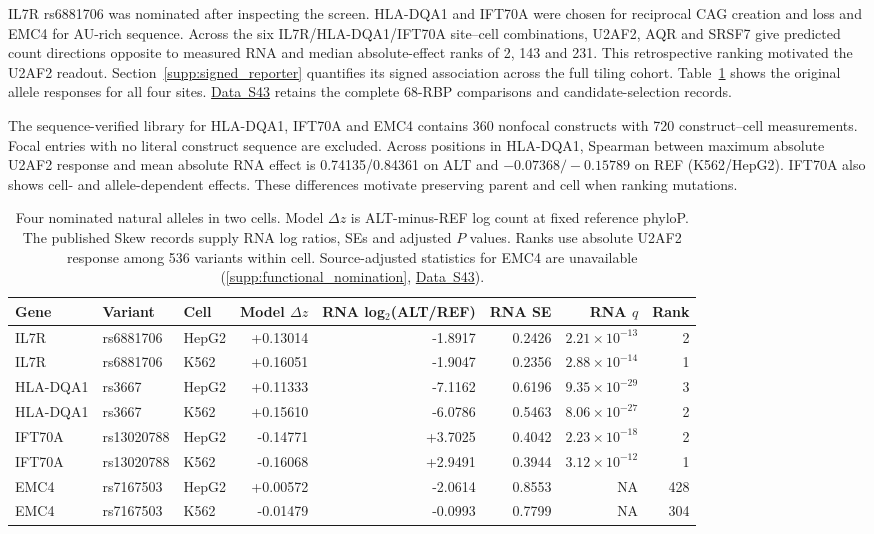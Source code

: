 \documentclass[11pt,a4paper]{article}
\newcommand{\tableid}[1]{\setcounter{table}{\numexpr#1-1\relax}}
\newcommand{\sr}[1]{\ref{#1}}
\newcommand{\data}[1]{\hyperref[data:S#1]{Data~S#1}}
\begin{document}
IL7R rs6881706 was nominated after inspecting the screen. HLA-DQA1 and IFT70A were chosen for reciprocal CAG creation and loss and EMC4 for AU-rich sequence. Across the six IL7R/HLA-DQA1/IFT70A site--cell combinations, U2AF2, AQR and SRSF7 give predicted count directions opposite to measured RNA and median absolute-effect ranks of 2, 143 and 231. This retrospective ranking motivated the U2AF2 readout. Section~\sr{supp:signed_reporter} quantifies its signed association across the full tiling cohort. Table~\ref{tab:discovery_natural} shows the original allele responses for all four sites. \data{43} retains the complete 68-RBP comparisons and candidate-selection records.

The sequence-verified library for HLA-DQA1, IFT70A and EMC4 contains 360 nonfocal constructs with 720 construct--cell measurements. Focal entries with no literal construct sequence are excluded. Across positions in HLA-DQA1, Spearman between maximum absolute U2AF2 response and mean absolute RNA effect is 0.74135/0.84361 on ALT and $-0.07368/-0.15789$ on REF (K562/HepG2). IFT70A also shows cell- and allele-dependent effects. These differences motivate preserving parent and cell when ranking mutations.

\tableid{20}
\begin{table}[H]\centering\small\setlength{\tabcolsep}{4pt}
\caption{Four nominated natural alleles in two cells. Model $\Delta z$ is ALT-minus-REF log count at fixed reference phyloP. The published Skew records supply RNA log ratios, SEs and adjusted $P$ values. Ranks use absolute U2AF2 response among 536 variants within cell. Source-adjusted statistics for EMC4 are unavailable (\sr{supp:functional_nomination}, \data{43}).}
\label{tab:discovery_natural}
\begin{tabular}{@{}lllrrrrr@{}}\toprule
Gene & Variant & Cell & Model $\Delta z$ & RNA log$_2$(ALT/REF) & RNA SE & RNA $q$ & Rank\\\midrule
IL7R & rs6881706 & HepG2 & +0.13014 & -1.8917 & 0.2426 & $2.21\times10^{-13}$ & 2 \\
IL7R & rs6881706 & K562 & +0.16051 & -1.9047 & 0.2356 & $2.88\times10^{-14}$ & 1 \\
HLA-DQA1 & rs3667 & HepG2 & +0.11333 & -7.1162 & 0.6196 & $9.35\times10^{-29}$ & 3 \\
HLA-DQA1 & rs3667 & K562 & +0.15610 & -6.0786 & 0.5463 & $8.06\times10^{-27}$ & 2 \\
IFT70A & rs13020788 & HepG2 & -0.14771 & +3.7025 & 0.4042 & $2.23\times10^{-18}$ & 2 \\
IFT70A & rs13020788 & K562 & -0.16068 & +2.9491 & 0.3944 & $3.12\times10^{-12}$ & 1 \\
EMC4 & rs7167503 & HepG2 & +0.00572 & -2.0614 & 0.8553 & NA & 428 \\
EMC4 & rs7167503 & K562 & -0.01479 & -0.0993 & 0.7799 & NA & 304 \\
\bottomrule\end{tabular}
\end{table}
\end{document}
